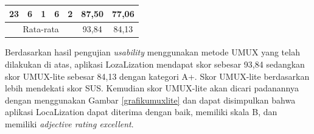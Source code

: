 \begin{table}[H]
\begin{tabular}{|ccccc|c|c|}
		\multicolumn{1}{|c|}{23}                                & \multicolumn{1}{c|}{6}                                                                          & \multicolumn{1}{c|}{1}                                                                          & \multicolumn{1}{c|}{6}                                                                          & 2                                                  & 87,50                                                & 77,06                                                     \\ \hline
		\multicolumn{5}{|c|}{Rata-rata}                         & 93,84                                                                                           & 84,13                                                                                                                                                                                                                                                                                                                                                                     \\ \hline
	\end{tabular}
\end{table}

\par Berdasarkan hasil pengujian \textit{usability} menggunakan metode UMUX yang telah dilakukan di atas, aplikasi LozaLization mendapat skor sebesar 93,84 sedangkan skor UMUX-lite sebesar 84,13 dengan kategori A+. Skor UMUX-lite berdasarkan \citep{Borsci2015} lebih mendekati skor SUS. Kemudian skor UMUX-lite akan dicari padanannya dengan menggunakan Gambar \ref{grafikumuxlite} dan dapat disimpulkan bahwa aplikasi LocaLization dapat diterima dengan baik, memiliki skala B, dan memiliki \textit{adjective rating excellent}.

